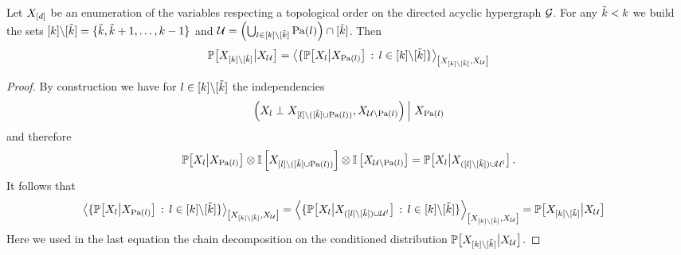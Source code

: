 \begin{lemma}\label{lem:bnSubContractionAsCondProb}
    Let $X_{[d]}$ be an enumeration of the variables respecting a topological order on the directed acyclic hypergraph $\mathcal{G}$.
    For any $\tilde{k}<k$ we build the sets $[k]\backslash[\tilde{k}] = \{\tilde{k},\tilde{k}+1,\ldots,k-1\}$ and $\mathcal{U}=\left(\bigcup_{l\in[k]\backslash[\tilde{k}]}\mathrm{Pa}(l)\right)\cap[\tilde{k}]$.
    Then
    \begin{align*}
        \mathbb{P}\big[X_{[k]\backslash[\tilde{k}]}\big|X_{\mathcal{U}}\big]
        = \left\langle 
            \{\mathbb{P}\big[X_{l}\big|X_{\mathrm{Pa}(l)}\big] \,:\, l\in[k]\backslash[\tilde{k}]\}
        \right\rangle_{\left[ 
            X_{[k]\backslash[\tilde{k}]},X_{\mathcal{U}}
         \right]}
    \end{align*}
\end{lemma}
\begin{proof}
    By construction we have for $l\in[k]\backslash[\tilde{k}]$ the independencies
    \begin{align*}
        \left(X_{l}\perp X_{[l]\backslash([\tilde{k}]\cup\mathrm{Pa}(l))},X_{\mathcal{U}\backslash\mathrm{Pa}(l)}\middle)\,\right|\,X_{\mathrm{Pa}(l)}
    \end{align*}
    and therefore
    \begin{align*}
        \mathbb{P}\big[X_{l}\big|X_{\mathrm{Pa}(l)}\big]
        \otimes \mathbb{I}\left[X_{[l]\backslash([\tilde{k}]\cup\mathrm{Pa}(l))}\right]
        \otimes \mathbb{I}\left[X_{\mathcal{U}\backslash\mathrm{Pa}(l)}\right]
        =  \mathbb{P}\big[X_{l}\big|X_{([l]\backslash[\tilde{k}])\cup\mathcal{U}^{l}}\big] \, .
    \end{align*}
    It follows that
    \begin{align*}
        &\left\langle 
            \{\mathbb{P}\big[X_{l}\big|X_{\mathrm{Pa}(l)}\big] \,:\, l\in[k]\backslash[\tilde{k}]\}
        \right\rangle_{\left[ 
            X_{[k]\backslash[\tilde{k}]},X_{\mathcal{U}}
         \right]}
        =\left\langle 
            \{\mathbb{P}\big[X_{l}\big|X_{([l]\backslash[\tilde{k}])\cup\mathcal{U}^{l}}\big] \,:\, l\in[k]\backslash[\tilde{k}]\}
        \right\rangle_{\left[ 
            X_{[k]\backslash[\tilde{k}]},X_{\mathcal{U}}
         \right]}
        =\mathbb{P}\big[X_{[k]\backslash[\tilde{k}]}\big|X_{\mathcal{U}}\big]
    \end{align*}
    Here we used in the last equation the chain decomposition on the conditioned distribution $\mathbb{P}\big[X_{[k]\backslash[\tilde{k}]}\big|X_{\mathcal{U}}\big]$.
\end{proof}

